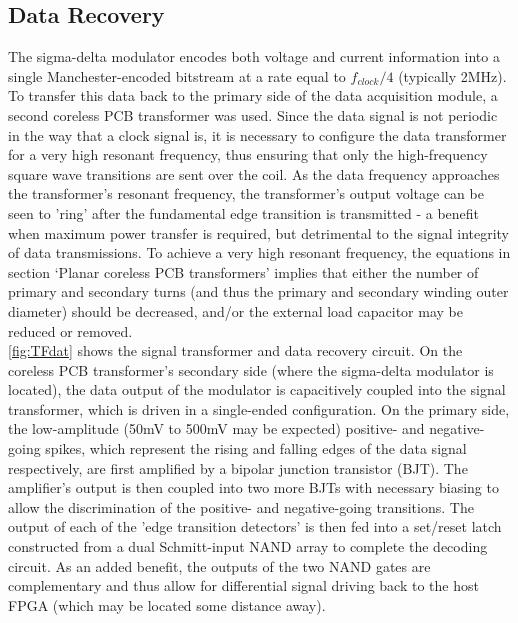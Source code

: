 \documentclass[conference]{IEEEtran}
\begin{document}
	\subsection{Data Recovery}
	The sigma-delta modulator encodes both voltage and current information into a single Manchester-encoded bitstream at a rate equal to $ f_{clock}/4 $ (typically 2MHz).  To transfer this data back to the primary side of the data acquisition module, a second coreless PCB transformer was used.  Since the data signal is not periodic in the way that a clock signal is, it is necessary to configure the data transformer for a very high resonant frequency, thus ensuring that only the high-frequency square wave transitions are sent over the coil.  As the data frequency approaches the transformer's resonant frequency, the transformer's output voltage can be seen to 'ring' after the fundamental edge transition is transmitted - a benefit when maximum power transfer is required, but detrimental to the signal integrity of data transmissions.  To achieve a very high resonant frequency, the equations in section `Planar coreless PCB transformers' implies that either the number of primary and secondary turns (and thus the primary and secondary winding outer diameter) should be decreased, and/or the external load capacitor may be reduced or removed. \\
	\ref{fig:TFdat} shows the signal transformer and data recovery circuit.  On the coreless PCB transformer's secondary side (where the sigma-delta modulator is located), the data output of the modulator is capacitively coupled into the signal transformer, which is driven in a single-ended configuration.  On the primary side, the low-amplitude (50mV to 500mV may be expected) positive- and negative-going spikes, which represent the rising and falling edges of the data signal respectively, are first amplified by a bipolar junction transistor (BJT).  The amplifier's output is then coupled into two more BJTs with necessary biasing to allow the discrimination of the positive- and negative-going transitions.  The output of each of the 'edge transition detectors' is then fed into a set/reset latch constructed from a dual Schmitt-input NAND array to complete the decoding circuit.  As an added benefit, the outputs of the two NAND gates are complementary and thus allow for differential signal driving back to the host FPGA (which may be located some distance away).
\end{document}
